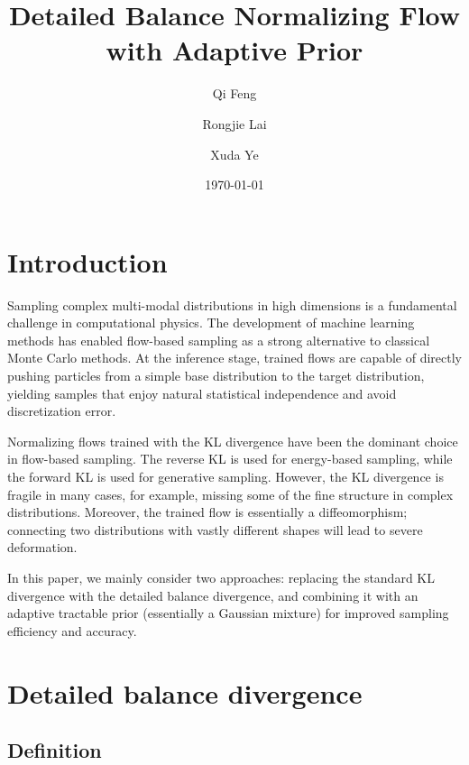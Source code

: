 \documentclass{article}
\title{Detailed Balance Normalizing Flow with Adaptive Prior}
\author[1]{Qi Feng}
\author[2]{Rongjie Lai}
\author[2]{Xuda Ye}
\affil[1]{Department of Mathematics, Florida State University, Tallahassee, FL 32306}
\affil[2]{Department of Mathematics, Purdue University, West Lafayette, IN 47907}
\date{\today}
\theoremstyle{plain}
\begin{document}
\maketitle

\section{Introduction}

Sampling complex multi-modal distributions in high dimensions is a fundamental challenge in computational physics. The development of machine learning methods has enabled flow-based sampling as a strong alternative to classical Monte Carlo methods. At the inference stage, trained flows are capable of directly pushing particles from a simple base distribution to the target distribution, yielding samples that enjoy natural statistical independence and avoid discretization error.

Normalizing flows trained with the KL divergence have been the dominant choice in flow-based sampling. The reverse KL is used for energy-based sampling, while the forward KL is used for generative sampling. However, the KL divergence is fragile in many cases, for example, missing some of the fine structure in complex distributions. Moreover, the trained flow is essentially a diffeomorphism; connecting two distributions with vastly different shapes will lead to severe deformation.

In this paper, we mainly consider two approaches: replacing the standard KL divergence with the detailed balance divergence, and combining it with an adaptive tractable prior (essentially a Gaussian mixture) for improved sampling efficiency and accuracy.

\section{Detailed balance divergence}

\subsection{Definition}
\end{document}
